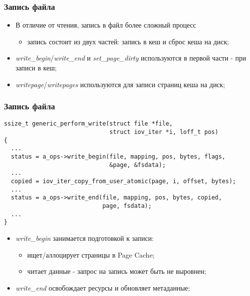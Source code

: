 \begin{frame}
\frametitle{Запись файла}
\begin{itemize}
  \item В отличие от чтения, запись в файл более сложный процесс
    \begin{itemize}
      \item запись состоит из двух частей: запись в кеш и сброс кеша на диск;
    \end{itemize}
  \item \emph{write\_begin}/\emph{write\_end} и \emph{set\_page\_dirty}
        используются в первой части - при записи в кеш;
  \item \emph{writepage}/\emph{writepages} используются для записи страниц кеша
        на диск;
\end{itemize}
\end{frame}

\begin{frame}[fragile]
\frametitle{Запись файла}
\begin{lstlisting}
ssize_t generic_perform_write(struct file *file,
                              struct iov_iter *i, loff_t pos)
{
  ...
  status = a_ops->write_begin(file, mapping, pos, bytes, flags,
                              &page, &fsdata);
  ...
  copied = iov_iter_copy_from_user_atomic(page, i, offset, bytes);
  ...
  status = a_ops->write_end(file, mapping, pos, bytes, copied,
                            page, fsdata);
  ...
}
\end{lstlisting}
\begin{itemize}
  \item \emph{write\_begin} занимается подготовкой к записи:
    \begin{itemize}
      \item ищет/аллоцирует страницы в Page Cache;
      \item читает данные - запрос на запись может быть не выровнен;
    \end{itemize}
  \item \emph{write\_end} освобождает ресурсы и обновляет метаданные;
\end{itemize}
\end{frame}

